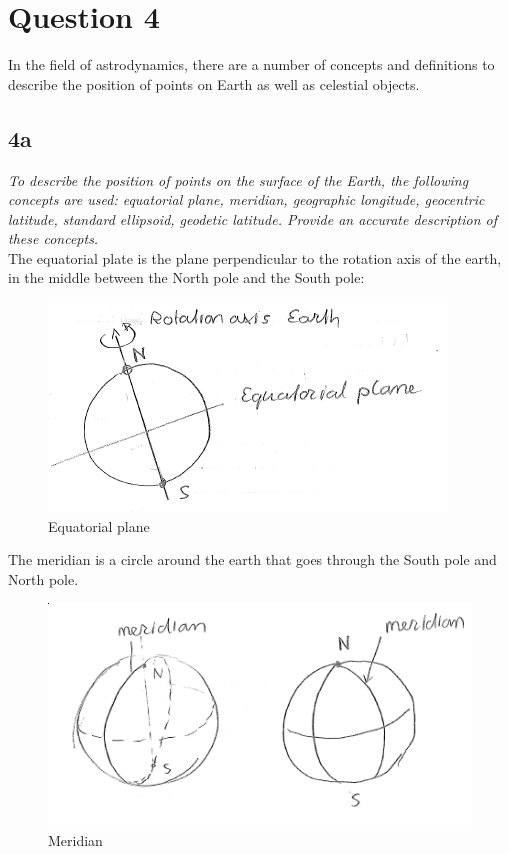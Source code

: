 \section{Question 4}\label{sec:q4}    

In the field of astrodynamics, there are a number of concepts and definitions to describe the position of points on Earth as well as celestial objects.

\subsection{4a}
\textit{To describe the position of points on the surface of the Earth, the following concepts are used: equatorial plane, meridian, geographic longitude, geocentric latitude, standard ellipsoid, geodetic latitude. Provide an accurate description of these concepts.} \\
The equatorial plate is the plane perpendicular to the rotation axis of the earth, in the middle between the North pole and the South pole:
\begin{figure}[H]
    \centering
    \includegraphics[width=0.6\columnwidth]{Figures/4a1.png}
    \caption{Equatorial plane}
    \label{fig:4a1}
\end{figure}

The meridian is a circle around the earth that goes through the South pole and North pole.
\begin{figure}[H]
    \centering
    \includegraphics[width=0.6\columnwidth]{Figures/4a2.png}
    \caption{Meridian}
    \label{fig:4a2}
\end{figure}

